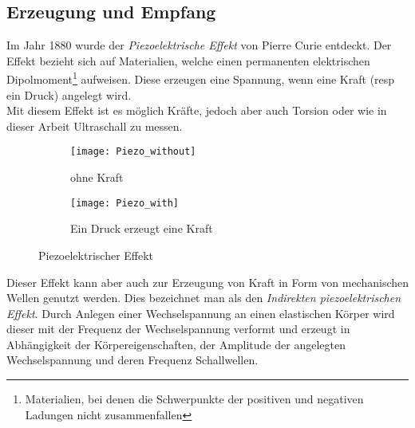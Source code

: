 \subsection{Erzeugung und Empfang}
Im Jahr 1880 wurde der \textit{Piezoelektrische Effekt} von Pierre Curie entdeckt. Der Effekt bezieht sich auf Materialien, welche einen permanenten elektrischen Dipolmoment\footnote{Materialien, bei denen die Schwerpunkte der positiven und negativen Ladungen nicht zusammenfallen} aufweisen. Diese erzeugen eine Spannung, wenn eine Kraft (\ac{resp} ein Druck) angelegt wird.\\
Mit diesem Effekt ist es möglich Kräfte, jedoch aber auch Torsion oder wie in dieser Arbeit Ultraschall zu messen. 
\begin{figure}[hb]
	\centering
	\begin{subfigure}[b]{0.49\textwidth}
		\centering
  		\texttt{[image: Piezo\_without]}  
  		\caption{ohne Kraft}
  		\label{fig:piezo_without}
  	\end{subfigure}
  	\hfill
  	\begin{subfigure}[b]{0.49\textwidth}
	  	\centering
  		\texttt{[image: Piezo\_with]}  
  		\caption{Ein Druck erzeugt eine Kraft}
  		\label{fig:piezo_with}
  	\end{subfigure}
  	\caption{Piezoelektrischer Effekt}
  	\label{fig:piezo}
\end{figure}
Dieser Effekt kann aber auch zur Erzeugung von Kraft in Form von mechanischen Wellen genutzt werden. Dies bezeichnet man als den \textit{Indirekten piezoelektrischen Effekt}. Durch Anlegen einer Wechselspannung an einen elastischen Körper wird dieser mit der Frequenz der Wechselspannung verformt und erzeugt in Abhängigkeit der Körpereigenschaften, der Amplitude der angelegten Wechselspannung und deren Frequenz Schallwellen.
%
\cite{suter2006}\cite{suter2009}\cite{suter2010}
%
